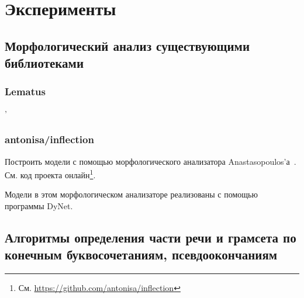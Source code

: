 \chapter{Эксперименты} \label{chapt_exp}

\section{Морфологический анализ существующими библиотеками} \label{sect_exp_libs}



\subsection{Lematus} \label{sect_exp_lematus}'




\subsection{antonisa/inflection}

Построить модели с помощью морфологического анализатора 
Anastasopoulos'а~\cite{Anastasopoulos2019Pushing_Limits_Low-Resource_MI}.
См. код проекта онлайн\footnote{См. \url{https://github.com/antonisa/inflection}}. 

Модели в этом морфологическом анализаторе реализованы с помощью программы DyNet. 

\section{Алгоритмы определения части речи и грамсета по конечным буквосочетаниям, псевдоокончаниям} \label{sect_exp_alg_end}


